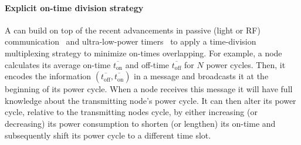 \paragraph{Explicit on-time division strategy}
A \sys can build on top of the recent advancements in passive (light or RF) communication~\cite{LuzLink,liu2013ambient} and ultra-low-power timers~\cite{hester2017timely} to apply a time-division multiplexing strategy to minimize on-times overlapping. For example, a node calculates its average on-time $\overline{t_\text{on}}$ and off-time $\overline{t_\text{off}}$ for $N$ power cycles. Then, it encodes the information $({\overline{t_\text{off}}, \overline{t_\text{on}}})$ in a message and broadcasts it at the beginning of its power cycle. When a node receives this message it will have full knowledge about the transmitting node's power cycle. It can then alter its power cycle, relative to the transmitting nodes cycle, by either increasing (or decreasing) its power consumption to shorten (or lengthen) its on-time and subsequently shift its power cycle to a different time slot. 

